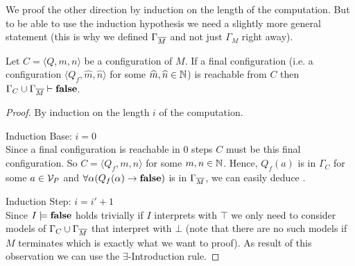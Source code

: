 We proof the other direction by induction on the length of the computation. But to be able to use the induction hypothesis we need a slightly more general statement (this is why we defined $\Gamma_{\overline{M}}$ and not just $\Gamma_M$ right away).
\begin{claim}\label{cla.3.6}
	Let $C=\langle Q,m,n\rangle$ be a configuration of $M$. If a final configuration (i.e. a configuration $\langle Q_f,\widehat{m},\widehat{n}\rangle$ for some $\widehat{m},\widehat{n}\in\mathbb{N}$) is reachable from $C$ then $\Gamma_C\cup\Gamma_{\overline{M}}\vdash\textbf{false}$.
\end{claim}
\begin{proof} By induction on the length $i$ of the computation.
	
	Induction Base: $i=0$\\
	Since a final configuration is reachable in 0 steps $C$ must be this final configuration. So $C=\langle Q_f,m,n\rangle$ for some $m,n\in\mathbb{N}$. Hence, $Q_f(a)$ is in $\Gamma_C$ for some $a\in\mathcal{V}_P$ and $\forall\alpha(Q_f(\alpha)\to\textbf{false})$ is in $\Gamma_{\overline{M}}$, we can easily deduce \false.
	\begin{figure}[H]
		\centering
		
	\end{figure}
	 
	Induction Step: $i= i'+1$\\
	Since $I\models\textbf{false}$ holds trivially if $I$ interprets \false{} with $\top$ we only need to consider models of $\Gamma_C\cup\Gamma_{\overline{M}}$ that interpret \false{} with $\bot$ (note that there are no such models if $M$ terminates which is exactly what we want to proof). As result of this observation we can use the $\exists$-Introduction rule.
	

\end{proof}
